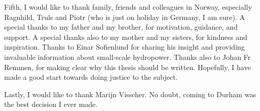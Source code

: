 \begin{quoting}
Fifth, I would like to thank family, friends and colleagues in Norway, especially Ragnhild, Truls and Piotr (who is just on holiday in Germany, I am sure). A special thanks to my father and my brother, for motivation, guidance, and support. A special thanks also to my mother and my sisters, for kindness and inspiration. Thanks to Einar Sofienlund for sharing his insight and providing invaluable information about small-scale hydropower. Thanks also to Johan Fr Remmen, for making clear why this thesis should be written. Hopefully, I have made a good start towards doing justice to the subject.

Lastly, I would like to thank Marijn Visscher. No doubt, coming to Durham was the best decision I ever made.

\end{quoting}







